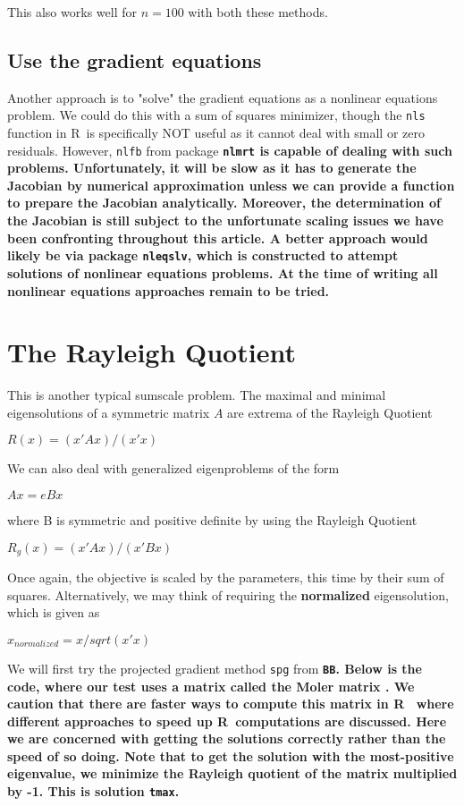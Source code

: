 \documentclass[11pt]{article}\usepackage[]{graphicx}\usepackage[]{color}
\newcommand{\B}[1]{{\bf #1 \rm}}
\newcommand{\R}{{\sf R}}
\newcommand{\code}[1]{{\tt#1}}
\newcommand{\pkg}[1]{\bf{\tt#1}\rm }
\begin{document}
This also works well for $n=100$ with both these methods.

\subsection{Use the gradient equations}

Another approach is to "solve" the gradient equations as a nonlinear equations
problem. We could do this with 
a sum of squares minimizer, though the \code{nls} function in \R\ is 
specifically NOT useful as it cannot deal
with small or zero residuals. However, \code{nlfb} 
from package \pkg{nlmrt} is capable of dealing
with such problems. Unfortunately, it will be slow as it has to 
generate the Jacobian by numerical
approximation unless we can provide a function to prepare the 
Jacobian analytically. Moreover,
the determination of the Jacobian is still subject to 
the unfortunate scaling issues we have
been confronting throughout this article. A better approach
would likely be via package \code{nleqslv}, which is constructed
to attempt solutions of nonlinear equations problems. At the time
of writing all nonlinear equations approaches remain to be tried.


\section{The Rayleigh Quotient}

This is another typical sumscale problem. 
The maximal and minimal eigensolutions of a symmetric matrix $A$ 
are extrema of the Rayleigh Quotient

$ R(x) =  (x' A x)  / (x' x) $

We can also deal with generalized eigenproblems of the form 

$A x = e B x$

where B is symmetric and positive definite by using the Rayleigh Quotient

$ R_g(x) =  (x' A x)  / (x' B x) $


Once again, the objective is scaled by the parameters, this time by their 
sum of squares. Alternatively, 
we may think of requiring the \B{normalized} eigensolution, which is given as 

$ x_{normalized} = x/sqrt(x' x) $

We will first try the projected gradient method \code{spg} from \pkg{BB}. 
Below is the code, where our test uses
a matrix called the Moler matrix \cite[Appendix 1]{cnm79}. We caution that there
are faster ways to compute this matrix in \R\ \citep{RQtimes12} where different
approaches to speed up \R\ computations are discussed. Here we are concerned 
with getting the solutions correctly rather than the speed of so doing. Note
that to get the solution with the most-positive eigenvalue, we minimize the
Rayleigh quotient of the matrix multiplied by -1. This is solution \code{tmax}.
\end{document}

